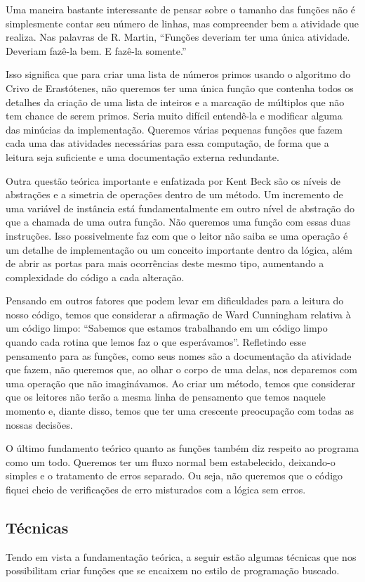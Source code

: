 Uma maneira bastante interessante de pensar sobre o tamanho das funções não é simplesmente contar seu número de linhas, mas compreender bem a atividade que realiza. Nas palavras de R. Martin, “Funções deveriam ter uma única atividade. Deveriam fazê-la bem. E fazê-la somente.”
	
Isso significa que para criar uma lista de números primos usando o algoritmo do Crivo de Erastótenes, não queremos ter uma única função que contenha todos os detalhes da criação de uma lista de inteiros e a marcação de múltiplos que não tem chance de serem primos. Seria muito difícil entendê-la e modificar alguma das minúcias da implementação. Queremos várias pequenas funções que fazem cada uma das atividades necessárias para essa computação, de forma que a leitura seja suficiente e uma documentação externa redundante.
	
Outra questão teórica importante e enfatizada por Kent Beck são os níveis de abstrações e a simetria de operações dentro de um método. Um incremento de uma variável de instância está fundamentalmente em outro nível de abstração do que a chamada de uma outra função. Não queremos uma função com essas duas instruções. Isso possivelmente faz com que o leitor não saiba se uma operação é um detalhe de implementação ou um conceito importante dentro da lógica, além de abrir as portas para mais ocorrências deste mesmo tipo, aumentando a complexidade do código a cada alteração.
	
Pensando em outros fatores que podem levar em dificuldades para a leitura do nosso código, temos que considerar a afirmação de Ward Cunningham relativa à um código limpo: “Sabemos que estamos trabalhando em um código limpo quando cada rotina que lemos faz o que esperávamos”. Refletindo esse pensamento para as funções, como seus nomes são a documentação da atividade que fazem, não queremos que, ao olhar o corpo de uma delas, nos deparemos com uma operação que não imaginávamos. Ao criar um método, temos que considerar que os leitores não terão a mesma linha de pensamento que temos naquele momento e, diante disso, temos que ter uma crescente preocupação com todas as nossas decisões.
	
O último fundamento teórico quanto as funções também diz respeito ao programa como um todo. Queremos ter um fluxo normal bem estabelecido, deixando-o simples e o tratamento de erros separado. Ou seja, não queremos que o código fiquei cheio de verificações de erro misturados com a lógica sem erros.
	
\subsection{Técnicas}
Tendo em vista a fundamentação teórica, a seguir estão algumas técnicas que nos possibilitam criar funções que se encaixem no estilo de programação buscado.

